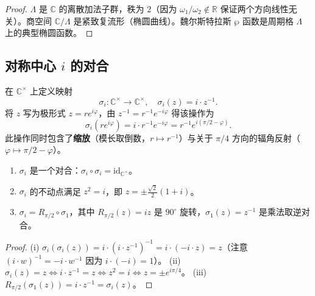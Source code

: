 \begin{proof}
$\Lambda$ 是 $\mathbb{C}$ 的离散加法子群，秩为 $2$（因为 $\omega_1/\omega_2 \notin \mathbb{R}$ 保证两个方向线性无关）。商空间 $\mathbb{C}/\Lambda$ 是紧致复流形（椭圆曲线）。魏尔斯特拉斯 $\wp$ 函数是周期格 $\Lambda$ 上的典型椭圆函数。
\end{proof}

\subsection{\texorpdfstring{对称中心 $i$ 的对合}{对称中心 i 的对合}}

\begin{definition}\label{def:complex_i_involution}
在 $\mathbb{C}^{\times}$ 上定义映射
\[
\sigma_i: \mathbb{C}^{\times} \to \mathbb{C}^{\times}, \quad \sigma_i(z) = i \cdot z^{-1}.
\]
将 $z$ 写为极形式 $z = re^{i\varphi}$，由 $z^{-1} = r^{-1}e^{-i\varphi}$ 得该操作为
\[
\sigma_i(re^{i\varphi}) = i \cdot r^{-1} e^{-i\varphi} = r^{-1} e^{i(\pi/2 - \varphi)}.
\]
此操作同时包含了\textbf{缩放}（模长取倒数，$r \mapsto r^{-1}$）与关于 $\pi/4$ 方向的辐角反射（$\varphi \mapsto \pi/2 - \varphi$）。
\end{definition}

\begin{proposition}\label{prop:complex_i_involution_properties}
\begin{enumerate}[label=(\roman*)]
    \item $\sigma_i$ 是一个对合：$\sigma_i \circ \sigma_i = \text{id}_{\mathbb{C}^{\times}}$。
    \item $\sigma_i$ 的不动点满足 $z^2 = i$，即 $z = \pm \frac{\sqrt{2}}{2}(1+i)$。
    \item $\sigma_i = R_{\pi/2} \circ \sigma_1$，其中 $R_{\pi/2}(z) = iz$ 是 $90^\circ$ 旋转，$\sigma_1(z) = z^{-1}$ 是乘法取逆对合。
\end{enumerate}
\end{proposition}

\begin{proof}
(i) $\sigma_i(\sigma_i(z)) = i \cdot (i \cdot z^{-1})^{-1} = i \cdot (-i \cdot z) = z$（注意 $(i \cdot w)^{-1} = -i \cdot w^{-1}$ 因为 $i \cdot (-i) = 1$）。
(ii) $\sigma_i(z) = z \iff i \cdot z^{-1} = z \iff z^2 = i \iff z = \pm e^{i\pi/4}$。
(iii) $R_{\pi/2}(\sigma_1(z)) = i \cdot z^{-1} = \sigma_i(z)$。
\end{proof}

